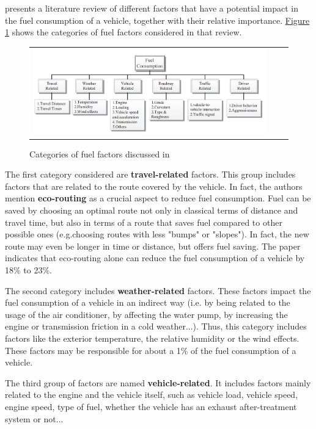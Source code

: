 \parencite{zhou2016review} presents a literature review of different factors that have a potential impact in the fuel consumption of a vehicle, together with their relative importance. \hyperref[figure:ch2-sota-chart-factors]{Figure} \ref{figure:ch2-sota-chart-factors} shows the categories of fuel factors considered in that review. 

\begin{figure}[h!]
\centering
 \begin{tabular}{c@{\qquad}c@{\qquad}c}
\includegraphics[width=0.8\columnwidth]{figures/chart_factors.PNG}
  \end{tabular} 
  \caption{Categories of fuel factors discussed in \parencite{zhou2016review} \label{figure:ch2-sota-chart-factors}}
\end{figure}

The first category considered are \textbf{travel-related} factors. This group includes factors that are related to the route covered by the vehicle. In fact, the authors mention \textbf{eco-routing} as a crucial aspect to reduce fuel consumption. Fuel can be saved by choosing an optimal route not only in classical terms of distance and travel time, but also in terms of a route that saves fuel compared to other possible ones (e.g.choosing routes with less "bumps" or "slopes"). In fact, the new route may even be longer in time or distance, but offers fuel saving. The paper indicates that eco-routing alone can reduce the fuel consumption of a vehicle by 18\% to 23\%.

The second category includes \textbf{weather-related} factors. These factors impact the fuel consumption of a vehicle in an indirect way (i.e. by being related to the usage of the air conditioner, by affecting the water pump, by increasing the engine or transmission friction in a cold weather...). Thus, this category includes factors like the exterior temperature, the relative humidity or the wind effects. These factors may be responsible for about a 1\% of the fuel consumption of a vehicle.

The third group of factors are named \textbf{vehicle-related}. It includes factors mainly related to the engine and the vehicle itself, such as vehicle load, vehicle speed, engine speed, type of fuel, whether the vehicle has an exhaust after-treatment system or not... 

